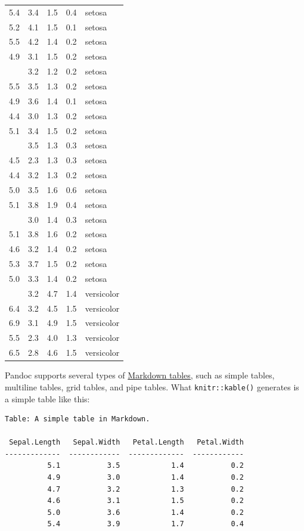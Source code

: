 \documentclass[doctor,openright,twoside]{sjtuthesis}
\newcommand{\passthrough}[1]{#1}
\theoremstyle{plain}
\theoremstyle{definition}
\theoremstyle{remark}
\theoremstyle{ocrenumbox}
\theoremstyle{plain}
\begin{document}
\begin{longtable}[t]{rrrrl}
5.4 & 3.4 & 1.5 & 0.4 & setosa\\
5.2 & 4.1 & 1.5 & 0.1 & setosa\\
5.5 & 4.2 & 1.4 & 0.2 & setosa\\
4.9 & 3.1 & 1.5 & 0.2 & setosa\\
\addlinespace
5.0 & 3.2 & 1.2 & 0.2 & setosa\\
5.5 & 3.5 & 1.3 & 0.2 & setosa\\
4.9 & 3.6 & 1.4 & 0.1 & setosa\\
4.4 & 3.0 & 1.3 & 0.2 & setosa\\
5.1 & 3.4 & 1.5 & 0.2 & setosa\\
\addlinespace
5.0 & 3.5 & 1.3 & 0.3 & setosa\\
4.5 & 2.3 & 1.3 & 0.3 & setosa\\
4.4 & 3.2 & 1.3 & 0.2 & setosa\\
5.0 & 3.5 & 1.6 & 0.6 & setosa\\
5.1 & 3.8 & 1.9 & 0.4 & setosa\\
\addlinespace
4.8 & 3.0 & 1.4 & 0.3 & setosa\\
5.1 & 3.8 & 1.6 & 0.2 & setosa\\
4.6 & 3.2 & 1.4 & 0.2 & setosa\\
5.3 & 3.7 & 1.5 & 0.2 & setosa\\
5.0 & 3.3 & 1.4 & 0.2 & setosa\\
\addlinespace
7.0 & 3.2 & 4.7 & 1.4 & versicolor\\
6.4 & 3.2 & 4.5 & 1.5 & versicolor\\
6.9 & 3.1 & 4.9 & 1.5 & versicolor\\
5.5 & 2.3 & 4.0 & 1.3 & versicolor\\
6.5 & 2.8 & 4.6 & 1.5 & versicolor\\
\bottomrule
\end{longtable}

Pandoc supports several types of
\href{http://pandoc.org/MANUAL.html\#tables}{Markdown tables,} such as
simple tables, multiline tables, grid tables, and pipe tables. What
\passthrough{\lstinline!knitr::kable()!} generates is a simple table
like this:

\begin{lstlisting}
Table: A simple table in Markdown.

 Sepal.Length   Sepal.Width   Petal.Length   Petal.Width
-------------  ------------  -------------  ------------
          5.1           3.5            1.4           0.2
          4.9           3.0            1.4           0.2
          4.7           3.2            1.3           0.2
          4.6           3.1            1.5           0.2
          5.0           3.6            1.4           0.2
          5.4           3.9            1.7           0.4
\end{lstlisting}
\end{document}
